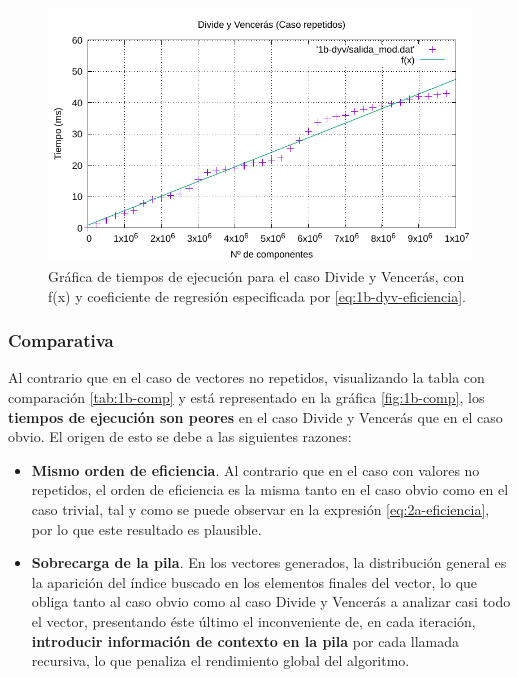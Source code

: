 \begin{figure}
    \centering
    \includegraphics[scale=0.76]{img/e1b-dyv}
    \caption{Gráfica de tiempos de ejecución para el caso Divide y Vencerás, 
    con f(x) y coeficiente de regresión especificada por \ref{eq:1b-dyv-eficiencia}.}
    \label{fig:1b-dyv-graph}
\end{figure}

\subsubsection{Comparativa} \label{sec:1b-comp}

Al contrario que en el caso de vectores no repetidos, visualizando la tabla
con comparación \ref{tab:1b-comp} y está representado en la gráfica \ref{fig:1b-comp}, 
los \textbf{tiempos 
de ejecución son peores} en el caso Divide y
Vencerás que en el caso obvio. El origen de esto se debe a las siguientes
razones:

\begin{itemize}
    \item \textbf{Mismo orden de eficiencia}. Al contrario que en el caso con valores 
    no repetidos, el orden de eficiencia
    es la misma tanto en el caso obvio como en el caso trivial, tal y como se puede
    observar en la expresión \ref{eq:2a-eficiencia}, por lo que este resultado es plausible. 
    \item \textbf{Sobrecarga de la pila}. En los vectores generados, la distribución 
    general es la aparición del índice
    buscado en los elementos finales del vector, lo que obliga tanto al caso obvio como al caso
    Divide y Vencerás a analizar casi todo el vector, presentando éste último el 
    inconveniente de, en cada iteración, \textbf{introducir información de contexto
    en la pila} por cada llamada recursiva, lo que penaliza el rendimiento global del
    algoritmo. 
\end{itemize}

